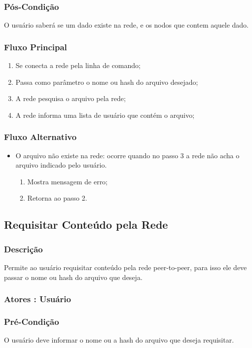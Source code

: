 \subsubsection{Pós-Condição}
O usuário saberá se um dado existe na rede, e os nodos que contem aquele dado.
\subsubsection{Fluxo Principal}
\begin{enumerate}
    \item Se conecta a rede pela linha de comando;
    \item Passa como parâmetro o nome ou hash do arquivo desejado;
    \item A rede pesquisa o arquivo pela rede;
    \item A rede informa uma lista de usuário que contém o arquivo;
\end{enumerate}
\subsubsection{Fluxo Alternativo}
\begin{itemize}
    \item O arquivo não existe na rede: ocorre quando no passo 3 a rede não acha o arquivo indicado pelo usuário.
    \begin{enumerate}
        \item Mostra mensagem de erro;
        \item Retorna ao passo 2.
    \end{enumerate}
\end{itemize}


\subsection{Requisitar Conteúdo pela Rede}
\subsubsection{Descrição}
Permite ao usuário requisitar conteúdo pela rede peer-to-peer, para isso ele deve passar o nome ou hash do arquivo que deseja.
\subsubsection{Atores : Usuário}
\subsubsection{Pré-Condição}
O usuário deve informar o nome ou a hash do arquivo que deseja requisitar.
